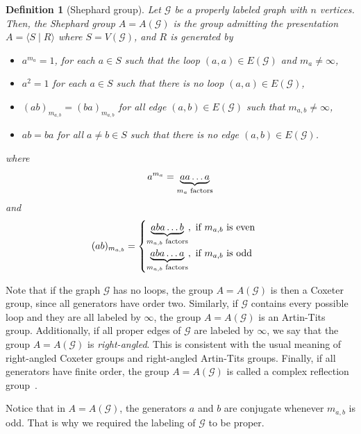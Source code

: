 \documentclass[11pt,letterpaper]{amsart}
\newtheorem{definition}[prop]{Definition}
\newcommand{\GG}{\mathcal{G}}
\begin{document}
\begin{definition}[Shephard group]
Let $\GG$ be a properly labeled graph with $n$ vertices. Then, the \emph{Shephard group} $A = A(\GG)$ is the group admitting the presentation $A = \langle S \mid R \rangle$ where $S = V(\GG)$, and $R$ is generated by
    \begin{itemize}
    \item $a^{m_a} = 1$, for each $a \in S$ such that the loop $(a,a) \in E(\GG)$ and $m_a \neq \infty$,
    \item $a^2 = 1$ for each $a \in S$ such that there is no loop $(a,a) \in E(\GG)$,
    \item $(ab)_{m_{a,b}} =(ba)_{m_{a,b}} $ for all edge $(a,b) \in E(\GG)$ such that $m_{a,b} \neq \infty$,
    \item $ab = ba$ for all $a \neq b \in S$ such that there is no edge $(a,b) \in E(\GG)$.
\end{itemize}
where $$a^{m_a} = \underbrace{aa\ldots a}_{m_a\textnormal{ factors}}$$
and
  \begin{equation*}
       (ab)_{m_{a,b}} =
        \begin{cases}
            \underbrace{aba\ldots b }_{m_{a,b}\textnormal{ factors}}, \textnormal{ if } m_{a,b} \textnormal{ is even } \\
            \underbrace{aba\ldots a }_{m_{a,b}\textnormal{ factors}}, \textnormal{ if } m_{a,b} \textnormal{ is odd }
        \end{cases}
    \end{equation*}
\end{definition}


Note that if the graph $\GG$ has no loops, the group $A = A(\GG)$ is then a Coxeter group, since all generators have order two. Similarly, if $\GG$ contains every possible loop and they are all labeled by $\infty$, the group $A = A(\GG)$ is an Artin-Tits group. Additionally, if all proper edges of $\GG$ are labeled by $\infty$, we say that the group $A = A(\GG)$ is \textit{right-angled}. This is consistent with the usual meaning of right-angled Coxeter groups and right-angled Artin-Tits groups. Finally, if all generators have finite order, the group $A = A (\GG)$ is called a complex reflection group~\cite{ShephardTodd1954}.

Notice that in $A = A(\GG)$, the generators $a$ and $b$ are conjugate whenever $m_{a,b}$ is odd. That is why we required the labeling of $\GG$ to be proper.
\end{document}
